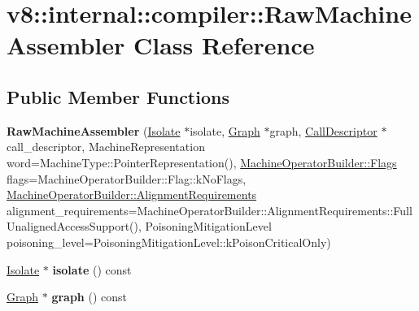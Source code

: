 \hypertarget{classv8_1_1internal_1_1compiler_1_1RawMachineAssembler}{}\section{v8\+:\+:internal\+:\+:compiler\+:\+:Raw\+Machine\+Assembler Class Reference}
\label{classv8_1_1internal_1_1compiler_1_1RawMachineAssembler}
\subsection*{Public Member Functions}
\begin{DoxyCompactItemize}
\item 
\mbox{\label{classv8_1_1internal_1_1compiler_1_1RawMachineAssembler_a821080f9e41b21c6b403d93c08328cfe}} 
{\bfseries Raw\+Machine\+Assembler} (\mbox{\hyperlink{classv8_1_1internal_1_1Isolate}{Isolate}} $\ast$isolate, \mbox{\hyperlink{classv8_1_1internal_1_1compiler_1_1Graph}{Graph}} $\ast$graph, \mbox{\hyperlink{classv8_1_1internal_1_1compiler_1_1CallDescriptor}{Call\+Descriptor}} $\ast$call\+\_\+descriptor, Machine\+Representation word=Machine\+Type\+::\+Pointer\+Representation(), \mbox{\hyperlink{classv8_1_1base_1_1Flags}{Machine\+Operator\+Builder\+::\+Flags}} flags=Machine\+Operator\+Builder\+::\+Flag\+::k\+No\+Flags, \mbox{\hyperlink{classv8_1_1internal_1_1compiler_1_1MachineOperatorBuilder_1_1AlignmentRequirements}{Machine\+Operator\+Builder\+::\+Alignment\+Requirements}} alignment\+\_\+requirements=Machine\+Operator\+Builder\+::\+Alignment\+Requirements\+::\+Full\+Unaligned\+Access\+Support(), Poisoning\+Mitigation\+Level poisoning\+\_\+level=Poisoning\+Mitigation\+Level\+::k\+Poison\+Critical\+Only)
\item 
\mbox{\label{classv8_1_1internal_1_1compiler_1_1RawMachineAssembler_a29dd586c3edfe61a9439749a5e556fb9}} 
\mbox{\hyperlink{classv8_1_1internal_1_1Isolate}{Isolate}} $\ast$ {\bfseries isolate} () const
\item 
\mbox{\label{classv8_1_1internal_1_1compiler_1_1RawMachineAssembler_aa213642bc00327eb3919ab2554031934}} 
\mbox{\hyperlink{classv8_1_1internal_1_1compiler_1_1Graph}{Graph}} $\ast$ {\bfseries graph} () const

\end{DoxyCompactItemize}
